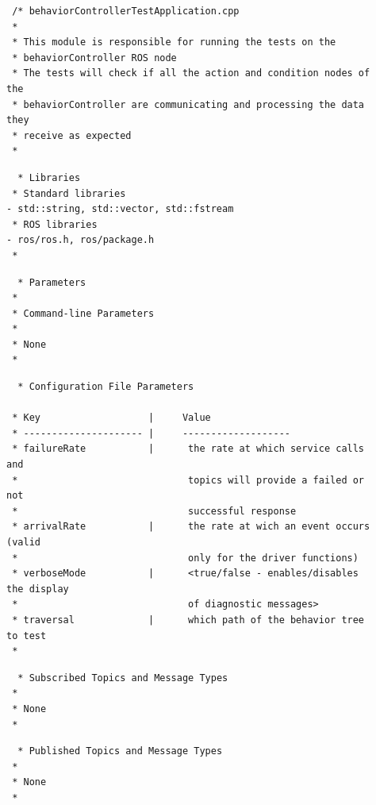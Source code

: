 \documentclass{CSSRforAfrica}
\newcommand{\checkboxChecked}{\fbox{\ding{51}}} %
\begin{document}
\begin{description}

\item[\checkboxChecked] 
 {\small 
\begin{verbatim}
 /* behaviorControllerTestApplication.cpp
 *
 * This module is responsible for running the tests on the
 * behaviorController ROS node
 * The tests will check if all the action and condition nodes of the
 * behaviorController are communicating and processing the data they
 * receive as expected
 *
\end{verbatim}}

\item[\checkboxChecked] 
 {\small 
\begin{verbatim}
  * Libraries
 * Standard libraries
- std::string, std::vector, std::fstream
 * ROS libraries
- ros/ros.h, ros/package.h
 *
\end{verbatim}}

\item[\checkboxChecked] 
 {\small 
\begin{verbatim}
  * Parameters
 *
 * Command-line Parameters
 *
 * None
 *
\end{verbatim}}

\item[\checkboxChecked] 
 {\small 
\begin{verbatim}
  * Configuration File Parameters

 * Key                   |     Value 
 * --------------------- |     -------------------
 * failureRate           |      the rate at which service calls and
 *                              topics will provide a failed or not
 *                              successful response
 * arrivalRate           |      the rate at wich an event occurs (valid
 *                              only for the driver functions)
 * verboseMode           |      <true/false - enables/disables the display
 *                              of diagnostic messages>
 * traversal             |      which path of the behavior tree to test
 *
\end{verbatim}}

\item[\checkboxChecked] 
 {\small 
\begin{verbatim}
  * Subscribed Topics and Message Types
 *
 * None
 * 
\end{verbatim}}

\item[\checkboxChecked] 
 {\small 
\begin{verbatim}                    
  * Published Topics and Message Types
 * 
 * None
 * 
\end{verbatim}}


\end{description}
\end{document}

